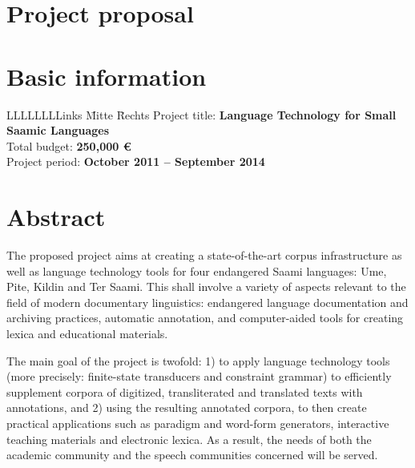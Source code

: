 \documentclass[a4paper,12pt]{article}
\begin{document}
\newpage

\section*{Project proposal}

\section{Basic information}

\begin{tabbing}
LLLLLLLLinks \= Mitte \= Rechts \kill
Project title: \>\textbf{Language Technology for Small Saamic Languages}\\
Total budget: \>\textbf{250,000 €}\\
Project period: \>\textbf{October 2011 – September 2014}\\
\end{tabbing}

\section{Abstract}%

The proposed project aims at creating a state-of-the-art corpus infrastructure as well as language technology tools for four endangered Saami languages: Ume, Pite, Kildin and Ter Saami. This shall involve a variety of aspects relevant to the field of modern documentary linguistics: endangered language documentation and archiving practices, automatic annotation, and computer-aided tools for creating lexica and educational materials.

The main goal of the project is twofold: 1) to apply language technology tools (more precisely: finite-state transducers and constraint grammar) to efficiently supplement corpora of digitized, transliterated and translated texts with annotations, and 2) using the resulting annotated corpora, to then create practical applications such as paradigm and word-form generators, interactive teaching materials and electronic lexica. As a result, the needs of both the academic community and the speech communities concerned will be served.

%
\end{document}
